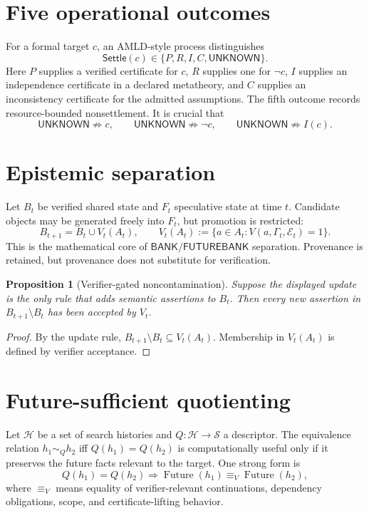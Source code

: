\documentclass[11pt,oneside]{book}
\newtheorem{proposition}[theorem]{Proposition}
\theoremstyle{definition}
\theoremstyle{remark}
\newcommand{\BANK}{\mathsf{BANK}}
\newcommand{\FB}{\mathsf{FUTUREBANK}}
\newcommand{\Future}{\operatorname{Future}}
\newcommand{\UNKNOWN}{\mathsf{UNKNOWN}}
\newcommand{\settle}{\mathsf{Settle}}
\begin{document}
\section{Five operational outcomes}
For a formal target \(c\), an AMLD-style process distinguishes
\[
\settle(c)\in\{P,R,I,C,\UNKNOWN\}.
\]
Here \(P\) supplies a verified certificate for \(c\), \(R\) supplies one for \(\neg c\), \(I\)
supplies an independence certificate in a declared metatheory, and \(C\) supplies an inconsistency
certificate for the admitted assumptions. The fifth outcome records resource-bounded nonsettlement.
It is crucial that
\[
\UNKNOWN\not\Rightarrow c,
\qquad
\UNKNOWN\not\Rightarrow\neg c,
\qquad
\UNKNOWN\not\Rightarrow I(c).
\]

\section{Epistemic separation}
Let \(B_t\) be verified shared state and \(F_t\) speculative state at time \(t\). Candidate objects
may be generated freely into \(F_t\), but promotion is restricted:
\[
B_{t+1}=B_t\cup V_t(A_t),
\qquad
V_t(A_t):=\{a\in A_t:V(a,\Gamma_t,\mathcal E_t)=1\}.
\]
This is the mathematical core of \(\BANK/\FB\) separation. Provenance is retained, but provenance
does not substitute for verification.

\begin{proposition}[Verifier-gated noncontamination]
\label{prop:noncontamination}
Suppose the displayed update is the only rule that adds semantic assertions to \(B_t\). Then every
new assertion in \(B_{t+1}\setminus B_t\) has been accepted by \(V_t\).
\end{proposition}

\begin{proof}
By the update rule, \(B_{t+1}\setminus B_t\subseteq V_t(A_t)\). Membership in \(V_t(A_t)\)
is defined by verifier acceptance.
\end{proof}

\section{Future-sufficient quotienting}
Let \(\mathcal H\) be a set of search histories and \(Q:\mathcal H\to\mathcal S\) a descriptor.
The equivalence relation \(h_1\sim_Q h_2\) iff \(Q(h_1)=Q(h_2)\) is computationally useful only
if it preserves the future facts relevant to the target. One strong form is
\[
Q(h_1)=Q(h_2)
\Longrightarrow
\Future(h_1)\equiv_V\Future(h_2),
\]
where \(\equiv_V\) means equality of verifier-relevant continuations, dependency obligations,
scope, and certificate-lifting behavior.
\end{document}
